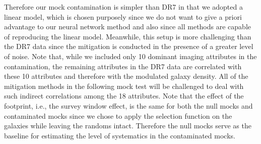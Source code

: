 Therefore our mock contamination is simpler than DR7 in that we adopted a linear model, which is chosen purposely since we do not want to give a priori advantage to our neural network method and also since all methods are capable of reproducing the linear model. Meanwhile, this setup is more challenging than the DR7 data since the mitigation is conducted in the presence of a greater level of noise. Note that, while we included only 10 dominant imaging attributes in the contamination, the remaining attributes in the DR7 data are correlated with these 10 attributes and therefore with the modulated galaxy density. All of the mitigation methods in the following mock test will be challenged to deal with such indirect correlations among the 18 attributes. Note that the effect of the footprint, i.e., the survey window effect, is the same for both the null mocks and contaminated mocks since we chose to apply the selection function on the galaxies while leaving the randoms intact. Therefore the null mocks serve as the baseline for estimating the level of systematics in the contaminated mocks.



